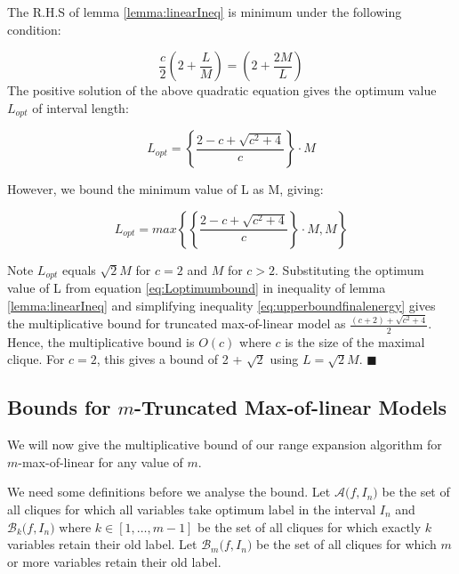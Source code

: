 \documentclass[10pt,letterpaper]{article}
\begin{document}
The R.H.S of lemma \ref{lemma:linearIneq} is minimum under the following condition:

\begin{equation}
\label{eq:linearboundEquality}
\frac{c}{2}\left(2 + \frac{L}{M}\right) =  \left(2 + \frac{2M}{L}\right)
\end{equation}
The positive solution of the above quadratic equation gives the optimum value $L_{opt}$ of interval length:

\begin{equation}
	L_{opt} = \left\{\frac{2 - c + \sqrt{c^2 + 4}}{c}\right\}\cdot M
\label{eq:Loptimum}
\end{equation}

However, we bound the minimum value of L as M, giving:

\begin{equation}
	L_{opt} = max\left\{\left\{\frac{2 - c + \sqrt{c^2 + 4}}{c}\right\}\cdot M, M\right\}
\label{eq:Loptimumbound}
\end{equation}

Note $L_{opt}$ equals $\sqrt{2}M$ for $c = 2$ and $M$ for $c > 2$. Substituting the optimum value of L from equation \ref{eq:Loptimumbound} in inequality of lemma \ref{lemma:linearIneq} and simplifying inequality \ref{eq:upperboundfinalenergy} gives the multiplicative bound for truncated max-of-linear model as $\frac{(c+2) + \sqrt{c^2 + 4}}{2}$. Hence, the multiplicative bound is $O(c)$ where $c$ is the size of the maximal clique. For $c = 2$, this gives a bound of 2 + $\sqrt{2}$ using $L = \sqrt{2}M$. \hspace{6mm} $\blacksquare$ 

\vspace{4mm}

\subsection{Bounds for $m$-Truncated Max-of-linear Models}

We will now give the multiplicative bound of our range expansion algorithm for $m$-max-of-linear for any value of $m$. 

We need some definitions before we analyse the bound. Let $\mathcal{A}\mathit(f, I_n)$ be the set of all cliques for which all variables take optimum label in the interval $I_{n}$ and $\mathcal{B}_k\mathit(f, I_n)$ where $k \in [1, \dots, m -1]$ be the set of all cliques for which exactly $k$ variables retain their old label. Let $\mathcal{B}_m\mathit(f, I_n)$ be the set of all cliques for which $m$ or more variables retain their old label.
\end{document}
